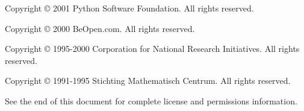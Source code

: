 Copyright \copyright{} 2001 Python Software Foundation.
All rights reserved.

Copyright \copyright{} 2000 BeOpen.com.
All rights reserved.

Copyright \copyright{} 1995-2000 Corporation for National Research Initiatives.
All rights reserved.

Copyright \copyright{} 1991-1995 Stichting Mathematisch Centrum.
All rights reserved.

See the end of this document for complete license and permissions
information.
